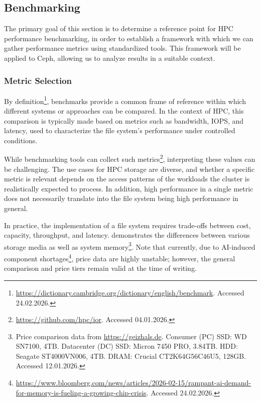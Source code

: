 \subsection{Benchmarking}

The primary goal of this section is to determine a reference point for \ac{HPC} performance benchmarking, in order to establish a framework with which we can gather performance metrics using standardized tools. This framework will be applied to Ceph, allowing us to analyze results in a suitable context.

\subsubsection{Metric Selection}

By definition\footnote{\url{https://dictionary.cambridge.org/dictionary/english/benchmark}. Accessed 24.02.2026.}, benchmarks provide a common frame of reference within which
different systems or approaches can be compared. In the context of \ac{HPC},
this comparison is typically made based on metrics such as bandwidth, \ac{IOPS},
and latency, used to characterize the file system's performance under controlled
conditions.

While benchmarking tools can collect such
metrics\footnote{\url{https://github.com/hpc/ior}. Accessed 04.01.2026.},
interpreting these values can be challenging. The use cases for \ac{HPC} storage
are diverse, and whether a specific metric is relevant depends on the access
patterns of the workloads the cluster is realistically expected to process. In
addition, high performance in a single metric does not necessarily translate
into the file system being high performance in general.

In practice, the implementation of a file system requires trade-offs between
cost, capacity, throughput, and latency. 
demonstrates the differences between various storage media as well as system
memory\footnote{Price comparison data from \url{https://geizhals.de}. Consumer (PC) \acs{SSD}: WD SN7100, 4TB. Datacenter (DC) \acs{SSD}: Micron 7450
PRO, 3.84TB. \acs{HDD}: Seagate ST4000VN006, 4TB. \acs{DRAM}: Crucial CT2K64G56C46U5,
128GB. Accessed 12.01.2026.}. Note that currently, due to \acs{AI}-induced component shortages\footnote{\url{https://www.bloomberg.com/news/articles/2026-02-15/rampant-ai-demand-for-memory-is-fueling-a-growing-chip-crisis}. Accessed 24.02.2026.}, price data are highly unstable; however, the general comparison and price tiers remain valid at the time of writing.

